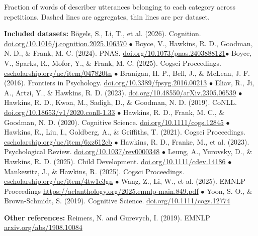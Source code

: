 \documentclass[11pt,a4paper]{article}
\begin{document}
\begin{small}
\begin{minipage}{.48\textwidth}
\begin{small}
			  Fraction of words of describer utterances belonging to each category across repetitions. Dashed lines are aggregates, thin lines are per dataset. 
	\end{small}
	
\end{minipage}

\bigskip
\begin{minipage}{\textwidth}
	\vspace{5pt}
	\begin{scriptsize} \textbf{Included datasets:}
		Bögels, S., Li, T., et al. (2026). Cognition. \url{doi.org/10.1016/j.cognition.2025.106370} $\bullet$ 
Boyce, V., Hawkins, R. D., Goodman, N. D., \& Frank, M. C. (2024). PNAS. \url{doi.org/10.1073/pnas.2403888121}$\bullet$
 Boyce, V., Sparks, R., Mofor, Y., \& Frank, M. C. (2025). Cogsci Proceedings. \url{escholarship.org/uc/item/047820tn} $\bullet$
  Branigan, H. P., Bell, J., \& McLean, J. F. (2016). Frontiers in Psychology. \url{doi.org/10.3389/fpsyg.2016.00213} $\bullet$
  Eliav, R., Ji, A., Artzi, Y., \& Hawkins, R. D. (2023). \url{doi.org/10.48550/arXiv.2305.06539} $\bullet$
   Hawkins, R. D., Kwon, M., Sadigh, D., \& Goodman, N. D. (2019). CoNLL. \url{doi.org/10.18653/v1/2020.conll-1.33} $\bullet$
   Hawkins, R. D., Frank, M. C., \& Goodman, N. D. (2020). Cognitive Science. \url{doi.org/10.1111/cogs.12845} $\bullet$ 
    Hawkins, R., Liu, I., Goldberg, A., \& Griffiths, T. (2021). Cogsci Proceedings. \url{escholarship.org/uc/item/6xz612cb} $\bullet$
		Hawkins, R. D., Franke, M., et al. (2023). Psychological Review. \url{doi.org/10.1037/rev0000348} $\bullet$
		 Leung, A., Yurovsky, D., \& Hawkins, R. D. (2025). Child Development. \url{doi.org/10.1111/cdev.14186} $\bullet$
		 Mankewitz, J., \& Hawkins, R. (2025). Cogsci Proceedings. \url{escholarship.org/uc/item/4tw1c3gn} $\bullet$ 
		 Wang, Z., Li, W., et al. (2025). EMNLP Proceedings \url{https://aclanthology.org/2025.emnlp-main.849.pdf} $\bullet$
 Yoon, S. O., \& Brown-Schmidt, S. (2019). Cognitive Science. \url{doi.org/10.1111/cogs.12774} 
	
\textbf{Other references:} Reimers, N. and Gurevych, I. (2019). EMNLP \url{arxiv.org/abs/1908.10084}


\end{scriptsize}
\end{minipage}

\end{small}
\end{document}
